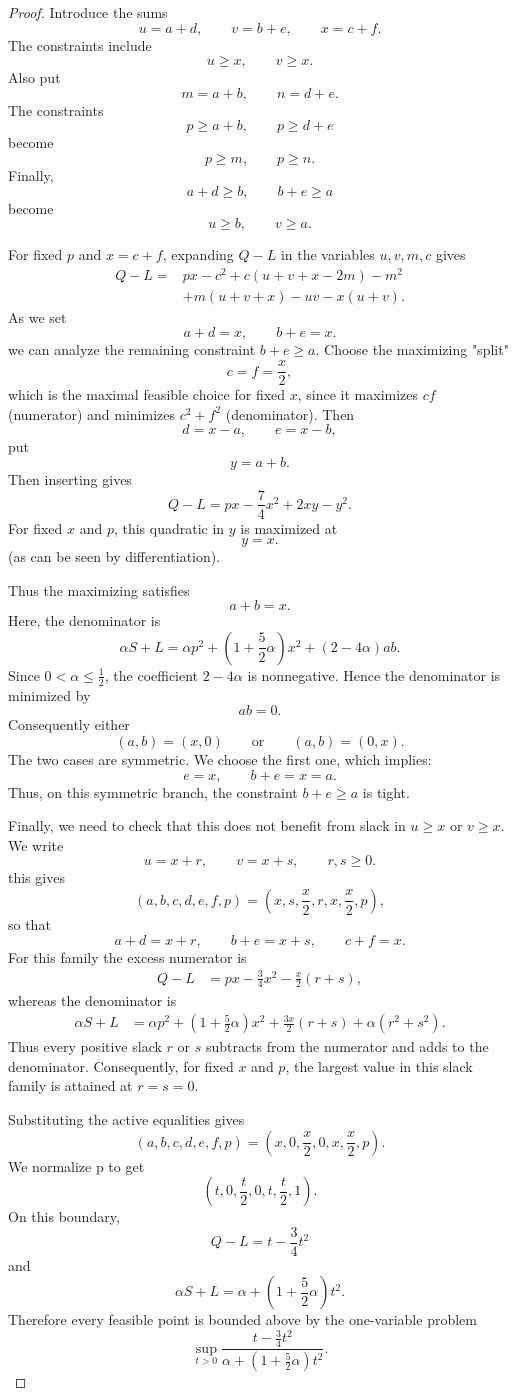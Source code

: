 \documentclass[11pt]{article}
\begin{document}
\begin{proof}
Introduce the sums
\[
u=a+d,\qquad v=b+e,\qquad x=c+f.
\]
The constraints include
\[
u\ge x,\qquad v\ge x.
\]
Also put
\[
m=a+b,\qquad n=d+e.
\]
The constraints
\[
p\ge a+b,\qquad p\ge d+e
\]
become
\[
p\ge m,\qquad p\ge n.
\]
Finally,
\[
a+d\ge b,\qquad b+e\ge a
\]
become
\[
u\ge b,\qquad v\ge a.
\]

For fixed \(p\) and \(x=c+f\), expanding \(Q-L\) in the variables
\(u,v,m,c\) gives
\[
\begin{aligned}
Q-L
={}&px-c^2+c(u+v+x-2m)-m^2\\
&+m(u+v+x)-uv-x(u+v).
\end{aligned}
\]
As we set
\[
a+d=x,\qquad b+e=x.
\]
we can analyze the remaining constraint \(b+e\ge a\). Choose the maximizing "split"
\[
c=f=\frac x2,
\]
which is the maximal feasible choice for fixed \(x\), since it maximizes \(cf\) (numerator)
and minimizes \(c^2+f^2\) (denominator).  Then
\[
d=x-a,\qquad e=x-b,
\]
put
\[
y=a+b.
\]
Then inserting gives
\[
Q-L
=
px-\frac74x^2+2xy-y^2.
\]
For fixed \(x\) and \(p\), this quadratic in \(y\) is maximized at
\[
y=x.
\]
(as can be seen by differentiation).

Thus the maximizing satisfies
\[
a+b=x.
\]
Here, the denominator is
\[
\alpha S+L
=
\alpha p^2+\left(1+\frac52\alpha\right)x^2
+(2-4\alpha)ab.
\]
Since \(0<\alpha\le \frac12\), the coefficient \(2-4\alpha\) is
nonnegative.  Hence the denominator is minimized by
\[
ab=0.
\]
Consequently either
\[
(a,b)=(x,0)
\qquad\text{or}\qquad
(a,b)=(0,x).
\]
The two cases are symmetric.  We choose the first one, which implies:
\[
e=x,\qquad b+e=x=a.
\]
Thus, on this symmetric branch, the constraint \(b+e\ge a\) is tight.

Finally, we need to check that this does not benefit from slack in
\(u\ge x\) or \(v\ge x\). We write
\[
u=x+r,\qquad v=x+s,
\qquad r,s\ge0.
\]
this gives
\[
(a,b,c,d,e,f,p)
=
\left(x,s,\frac x2,r,x,\frac x2,p\right),
\]
so that
\[
a+d=x+r,\qquad b+e=x+s,\qquad c+f=x.
\]
For this family the excess numerator is
\[
\begin{aligned}
Q-L
&=px-\frac34x^2-\frac{x}{2}(r+s),
\end{aligned}
\]
whereas the denominator is
\[
\begin{aligned}
\alpha S+L
&=
\alpha p^2+\left(1+\frac52\alpha\right)x^2
+\frac{3x}{2}(r+s)+\alpha(r^2+s^2).
\end{aligned}
\]
Thus every positive slack \(r\) or \(s\) subtracts from the numerator
and adds to the denominator.  Consequently, for fixed \(x\) and \(p\),
the largest value in this slack family is attained at
$
r=s=0.
$

Substituting the active equalities gives
\[
(a,b,c,d,e,f,p)
=
\left(x,0,\frac x2,0,x,\frac x2,p\right).
\]
We normalize p to get
\[
\left(t,0,\frac t2,0,t,\frac t2,1\right).
\]
On this boundary,
\[
Q-L=t-\frac34t^2
\]
and
\[
\alpha S+L
=
\alpha+\left(1+\frac52\alpha\right)t^2.
\]
Therefore every feasible point is bounded above by the one-variable
problem
\[
\sup_{t>0}
\frac{t-\frac34t^2}{\alpha+\left(1+\frac52\alpha\right)t^2}.
\]
\end{proof}
\end{document}
